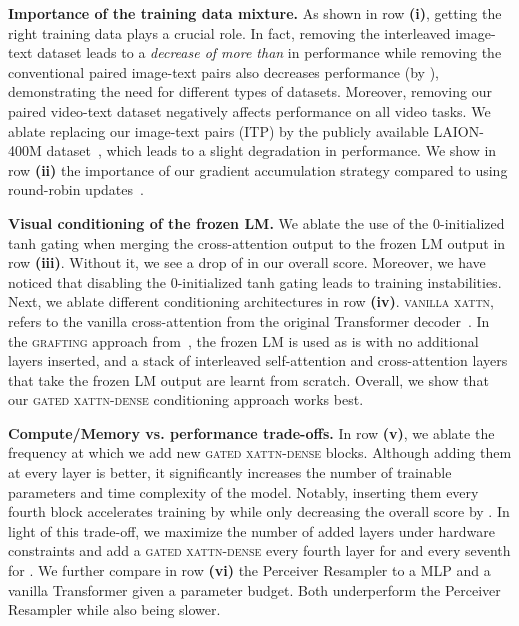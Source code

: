 \noindent
\textbf{Importance of the training data mixture.}
As shown in row \textbf{(i)}, getting the right training data plays a crucial role.
In fact, removing the interleaved image-text dataset \mmmw{} leads to a \emph{decrease of more than } in performance while removing the conventional paired image-text pairs also decreases performance (by ), demonstrating the need for different types of datasets.
Moreover, removing our paired video-text dataset negatively affects performance on all video tasks.
We ablate replacing our image-text pairs (ITP) by the publicly available LAION-400M dataset~\cite{schuhmann2021laion}, which leads to a slight degradation in performance.
We show in row \textbf{(ii)} the importance of our gradient accumulation strategy compared to using round-robin updates~\citep{cho2021unifying}.

\noindent
\textbf{Visual conditioning of the frozen LM.}
We ablate the use of the 0-initialized tanh gating when merging the cross-attention output to the frozen LM output in row \textbf{(iii)}.
Without it, we see a drop of  in our overall score.
Moreover, we have noticed that disabling the 0-initialized tanh gating leads to training instabilities.
Next, we ablate different conditioning architectures in row \textbf{(iv)}.
\textsc{vanilla xattn}, refers to the vanilla cross-attention from the original Transformer decoder~\citep{vaswani2017attention}.
In the \textsc{grafting} approach from~\cite{luo2022vc}, the frozen LM is used as is with no additional layers inserted, and a stack of interleaved self-attention and cross-attention layers that take the frozen LM output are learnt from scratch.
Overall, we show that our \textsc{gated xattn-dense} conditioning approach works best.

\noindent
\textbf{Compute/Memory vs. performance trade-offs.}
In row \textbf{(v)}, we ablate the frequency at which we add new \textsc{gated xattn-dense} blocks.
Although adding them at every layer is better, it significantly increases the number of trainable parameters and time complexity of the model.
Notably, inserting them every fourth block accelerates training by  while only decreasing the overall score by .
In light of this trade-off, we maximize the number of added layers under hardware constraints and add a \textsc{gated xattn-dense} every fourth layer for \medium{} and every seventh for \largemfull{}.
We further compare in row \textbf{(vi)} the Perceiver Resampler to a MLP and a vanilla Transformer given a parameter budget.
Both underperform the Perceiver Resampler while also being slower.


